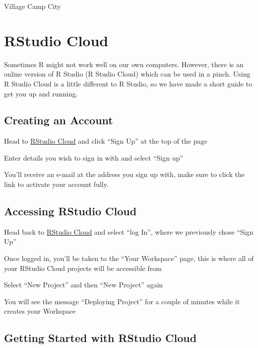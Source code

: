 \documentclass[]{book}
\begin{document}
 Village Camp City

\hypertarget{appendix-appendices}{%
\appendix}


\hypertarget{rstudio-cloud}{%
\chapter{RStudio Cloud}\label{rstudio-cloud}}

Sometimes R might not work well on our own computers. However, there is an online version of R Studio (R Studio Cloud) which can be used in a pinch. Using R Studio Cloud is a little different to R Studio, so we have made a short guide to get you up and running.

\hypertarget{creating-an-account}{%
\section{Creating an Account}\label{creating-an-account}}

Head to \href{https://rstudio.cloud/}{RStudio Cloud} and click ``Sign Up'' at the top of the page

Enter details you wish to sign in with and select ``Sign up''

You'll receive an e-mail at the address you sign up with, make sure to click the link to activate your account fully.

\hypertarget{accessing-rstudio-cloud}{%
\section{Accessing RStudio Cloud}\label{accessing-rstudio-cloud}}

Head back to \href{https://rstudio.cloud/}{RStudio Cloud} and select ``log In'', where we previously chose ``Sign Up''

Once logged in, you'll be taken to the ``Your Workspace'' page, this is where all of your RStudio Cloud projects will be accessible from

Select ``New Project'' and then ``New Project'' again

You will see the message ``Deploying Project'' for a couple of minutes while it creates your Workspace

\hypertarget{getting-started-with-rstudio-cloud}{%
\section{Getting Started with RStudio Cloud}\label{getting-started-with-rstudio-cloud}}
\end{document}
